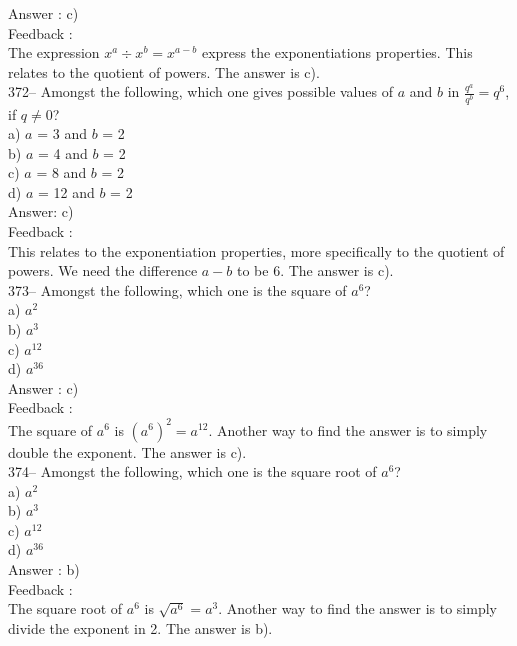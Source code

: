 \documentclass[letterpaper, 12pt]{article}
\begin{document}
Answer : c)\\

Feedback : \\
The expression $x^{a}\div x^{b}=x^{a-b}$ express the exponentiations properties. 
This relates to the quotient of powers.  
The answer is c).\\


372-- Amongst the following, which one gives possible values of $a$ and $b$ in $\frac{q^a}{q^b}=q^{6}$, if
$q\neq0$?\\
a) $a$ = 3 and $b$ = 2\\
b) $a$ = 4 and $b$ = 2\\
c) $a$ = 8 and $b$ = 2\\
d) $a$ = 12 and $b$ = 2\\

Answer: c)\\

Feedback : \\
This relates to the exponentiation properties, more specifically to the quotient of powers. We need the difference $a-b$ to be 6. 
The answer is c).\\

373-- Amongst the following, which one is the square of $a^{6}$?\\
a) $a^{2}$\\
b) $a^{3}$\\
c) $a^{12}$\\
d) $a^{36}$\\

Answer : c) \\

Feedback : \\
The square of $a^{6}$ is $\left( a^{6}\right)^{2}=a^{12}$.  Another way to find the answer is to simply double the exponent. The answer is c).\\

374-- Amongst the following, which one is the square root of $a^{6}$?\\
a) $a^{2}$\\
b) $a^{3}$\\
c) $a^{12}$\\
d) $a^{36}$\\

Answer : b) \\

Feedback : \\
The square root of $a^{6}$ is $ \sqrt{a^{6}}=a^{3}$.  Another way to find the answer is to simply divide the exponent in 2. The answer is b).\\
\end{document}
